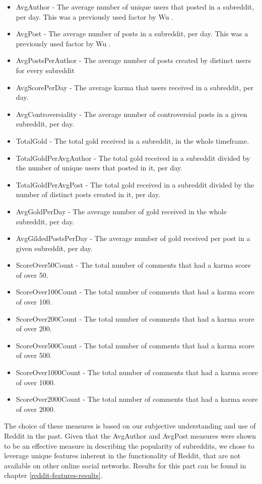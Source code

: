 \documentclass[bsc,frontabs,twoside,singlespacing,parskip,deptreport]{infthesis}
\begin{document}
\begin{itemize}
	\item AvgAuthor - The average number of unique users that posted in a subreddit, per day. This was a previously used factor by Wu \cite{masters}.
	\item AvgPost - The average number of posts in a subreddit, per day. This was a previously used factor by Wu \cite{masters}.
	\item AvgPostsPerAuthor - The average number of posts created by distinct users for every subreddit
	\item AvgScorePerDay - The average karma that users received in a subreddit, per day.
	\item AvgControversiality - The average number of controversial posts in a given subreddit, per day.
	\item TotalGold - The total gold received in a subreddit, in the whole timeframe.
	\item TotalGoldPerAvgAuthor - The total gold received in a subreddit divided by the number of unique users that posted in it, per day.
	\item TotalGoldPerAvgPost - The total gold received in a subreddit divided by the number of distinct posts created in it, per day.
	\item AvgGoldPerDay - The average number of gold received in the whole subreddit, per day.
	\item AvgGildedPostsPerDay - The average number of gold received per post in a given subreddit, per day.
	\item ScoreOver50Count - The total number of comments that had a karma score of over 50.
	\item ScoreOver100Count - The total number of comments that had a karma score of over 100.
	\item ScoreOver200Count - The total number of comments that had a karma score of over 200.
	\item ScoreOver500Count - The total number of comments that had a karma score of over 500.
	\item ScoreOver1000Count - The total number of comments that had a karma score of over 1000.
	\item ScoreOver2000Count - The total number of comments that had a karma score of over 2000.
\end{itemize}

The choice of these measures is based on our subjective understanding and use of Reddit in the past. Given that the AvgAuthor and AvgPost measures were shown to be an effective measure in describing the popularity of subreddits, we chose to leverage unique features inherent in the functionality of Reddit, that are not available on other online social networks. Results for this part can be found in chapter \ref{reddit-features-results}.
\end{document}

